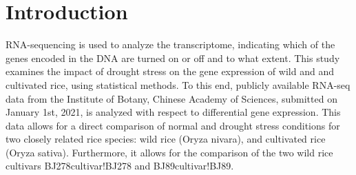 \section{Introduction}

RNA-sequencing is used to analyze the transcriptome, indicating which of the genes encoded in the DNA are turned on or off and to what extent. This study examines the impact of drought stress on the gene expression of wild and and cultivated rice, using statistical methods. To this end, publicly available RNA-seq data from the Institute of Botany, Chinese Academy of Sciences, submitted on January 1st, 2021, is analyzed with respect to differential gene expression. This data allows for a direct comparison of normal and drought stress conditions for two closely related rice species: wild rice (Oryza nivara), and cultivated rice (Oryza sativa). Furthermore, it allows for the comparison of the two wild rice cultivars BJ278{cultivar!BJ278} and BJ89{cultivar!BJ89}.